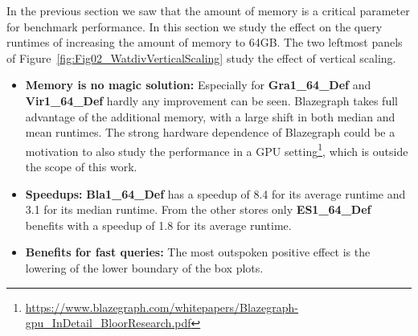 %

%
%
In the previous section we saw that the amount of memory is a critical parameter for benchmark performance. 
In this section we study the effect on the query runtimes of increasing the amount of memory to 64GB.
The two leftmost panels of Figure~\ref{fig:Fig02_WatdivVerticalScaling} study the effect of vertical scaling. 
%



\begin{itemize}
	\item \textbf{Memory is no magic solution:} Especially for \textbf{Gra1\_64\_Def} and \textbf{Vir1\_64\_Def} hardly any improvement can be seen. Blazegraph takes full advantage of the additional memory, with a large shift in both median and mean runtimes. The strong hardware dependence of Blazegraph could be a motivation to also study the performance in a GPU setting\footnote{\scriptsize \url{https://www.blazegraph.com/whitepapers/Blazegraph-gpu_InDetail_BloorResearch.pdf}}, which is outside the scope of this work.
	\item \textbf{Speedups:} \textbf{Bla1\_64\_Def} has a speedup of 8.4 for its average runtime and 3.1 for its median runtime. From the other stores only \textbf{ES1\_64\_Def} benefits with a speedup of 1.8 for its average runtime.
	\item \textbf{Benefits for fast queries:} The most outspoken positive effect is the lowering of the lower boundary of the box plots.  
\end{itemize}




